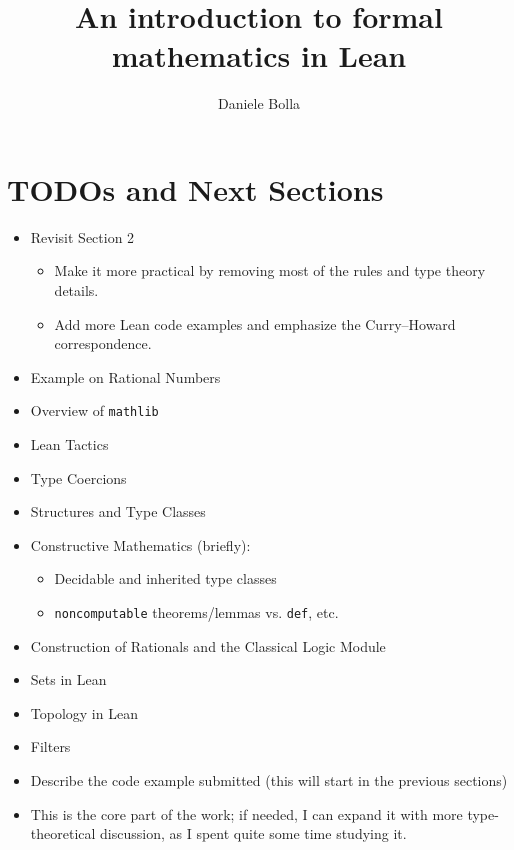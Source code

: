 \documentclass{article}
\title{An introduction to formal mathematics in Lean}
\author{Daniele Bolla}
\numberwithin{figure}{theorem}
\begin{document}
\tableofcontents

% 


\section{TODOs and Next Sections}

\begin{itemize}
    \item Revisit Section 2
    \begin{itemize}
        \item Make it more practical by removing most of the rules and type theory details.
        \item Add more Lean code examples and emphasize the Curry–Howard correspondence.
    \end{itemize}
    \item Example on Rational Numbers
    \item Overview of \texttt{mathlib}
    \item Lean Tactics
    \item Type Coercions
    \item Structures and Type Classes
    \item Constructive Mathematics (briefly):
    \begin{itemize}
        \item Decidable and inherited type classes
        \item \texttt{noncomputable} theorems/lemmas vs. \texttt{def}, etc.
    \end{itemize}
    \item Construction of Rationals and the Classical Logic Module
    \item Sets in Lean
    \item Topology in Lean
    \item Filters
    \item Describe the code example submitted  (this will start in the previous sections)
    \item This is the core part of the work; if needed, I can expand it with more
    type-theoretical discussion, as I spent quite some time studying it.
\end{itemize}

% 
% 
% 
%   
%   
% 
% 
\end{document}
